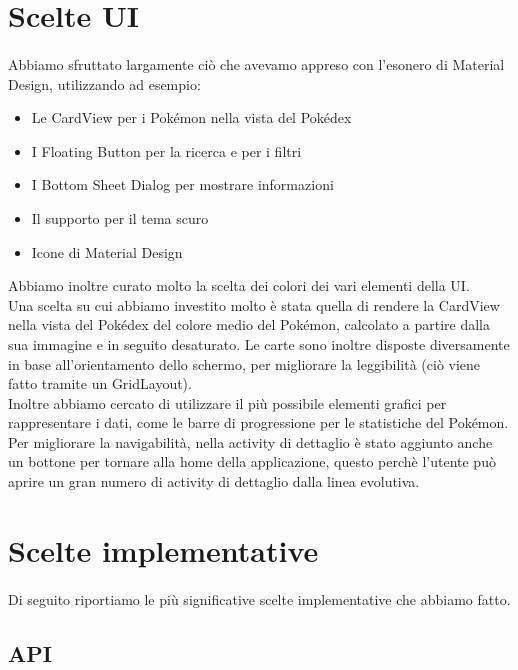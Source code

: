 \documentclass[a4paper,11pt]{article}
\begin{document}
	\section{Scelte UI}
		\paragraph{}
			Abbiamo sfruttato largamente ciò che avevamo appreso con l’esonero di Material Design, utilizzando ad esempio:
			\begin{itemize}
				\item Le CardView per i Pokémon nella vista del Pokédex
				\item I Floating Button per la ricerca e per i filtri
				\item I Bottom Sheet Dialog per mostrare informazioni
				\item Il supporto per il tema scuro
				\item Icone di Material Design
			\end{itemize} 
			Abbiamo inoltre curato molto la scelta dei colori dei vari elementi della UI.\\
			Una scelta su cui abbiamo investito molto è stata quella di rendere la CardView nella vista del Pokédex del colore medio del Pokémon, calcolato a partire dalla sua immagine e in seguito desaturato. Le carte sono inoltre disposte diversamente in base all’orientamento dello schermo, per migliorare la leggibilità (ciò viene fatto tramite un GridLayout).\\
			Inoltre abbiamo cercato di utilizzare il più possibile elementi grafici per rappresentare i dati, come le barre di progressione per le statistiche del Pokémon.\\
			Per migliorare la navigabilità, nella activity di dettaglio è stato aggiunto anche un bottone per tornare alla home della applicazione, questo perchè l’utente può aprire un gran numero di activity di dettaglio dalla linea evolutiva. \newpage
 
  	\section{Scelte implementative}
  		\paragraph{}
  			Di seguito riportiamo le più significative scelte implementative che abbiamo fatto.
  				\subsection{API}
\end{document}
